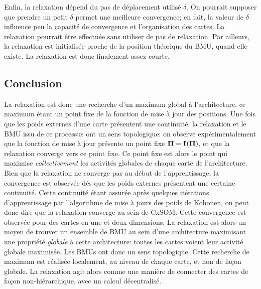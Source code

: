 Enfin, la relaxation dépend du pas de déplacement utilisé $\delta$. On pourrait supposer que prendre un petit $\delta$ permet une meilleure convergence; en fait, la valeur de $\delta$ influence peu la capacité de convergence et l'organisation des cartes. La relaxation pourrait être effectuée sans utiliser de pas de relaxation. Par ailleurs, la relaxation est initialisée proche de la position théorique du BMU, quand elle existe. La relaxation est donc finalement assez courte.

\subsection{Conclusion}
La relaxation est donc une recherche d'un maximum global à l'architecture, ce maximum étant un point fixe de la fonction de mise à jour des positions.
Une fois que les poids externes d'une carte présentent une continuité, la relaxation et le BMU issu de ce processus ont un sens topologique: on observe expérimentalement que la fonction de mise à jour présente un point fixe $\mathbf{\Pi} = \mathbf{f}(\mathbf{\Pi})$, et que la relaxation converge vers ce point fixe. Ce point fixe est alors le point qui maximise \emph{collectivement} les activités globales de chaque carte de l'architecture.
Bien que la relaxation ne converge pas au début de l'apprentissage, la convergence est observée dès que les poids externes présentent une certaine continuité. Cette continuité étant assurée après quelques itérations d'apprentissage par l'algorithme de mise à jours des poids de Kohonen, on peut donc dire que la relaxation converge au sein de CxSOM. Cette convergence est observée pour des cartes en une et deux dimensions.
La relaxation est alors un moyen de trouver un ensemble de BMU au sein d'une architecture maximisant une propriété \emph{globale} à cette architecture: toutes les cartes voient leur activité globale maximisée. Les BMUs ont donc un sens topologique. Cette recherche de maximum est réalisée localement, au niveau de chaque carte, et non de façon globale. La relaxation agit alors comme une manière de connecter des cartes de façon non-hiérarchique, avec un calcul décentralisé.